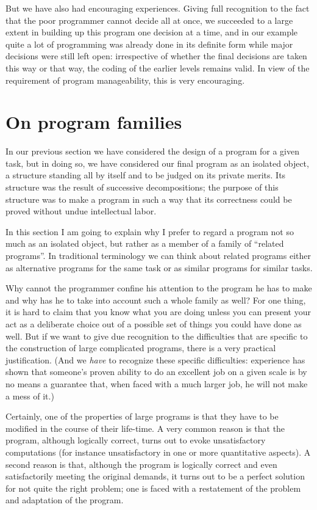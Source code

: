 But we have also had encouraging experiences. Giving full recognition to the fact that the poor programmer cannot decide all at once, we succeeded to a large extent in building up this program one decision at a time, and in our example quite a lot of programming was already done in its definite form while major decisions were still left open: irrespective of whether the final decisions are taken this way or that way, the coding of the earlier levels remains valid. In view of the requirement of program manageability, this is very encouraging.

\section{On program families}

In our previous section we have considered the design of a program for a given task, but in doing so, we have considered our final program as an isolated object, a structure standing all by itself and to be judged on its private merits. Its structure was the result of successive decompositions; the purpose of this structure was to make a program in such a way that its correctness could be proved without undue intellectual labor.

In this section I am going to explain why I prefer to regard a program not so much as an isolated object, but rather as a member of a family of ``related programs''. In traditional terminology we can think about related programs either as alternative programs for the same task or as similar programs for similar tasks.

Why cannot the programmer confine his attention to the program he has to make and why has he to take into account such a whole family as well? For one thing, it is hard to claim that you know what you are doing unless you can present your act as a deliberate choice out of a possible set of things you could have done as well. But if we want to give due recognition to the difficulties that are specific to the construction of large complicated programs, there is a very practical justification. (And we \textit{have} to recognize these specific difficulties: experience has shown that someone's proven ability to do an excellent job on a given scale is by no means a guarantee that, when faced with a much larger job, he will not make a mess of it.)

Certainly, one of the properties of large programs is that they have to be modified in the course of their life-time. A very common reason is that the program, although logically correct, turns out to evoke unsatisfactory computations (for instance unsatisfactory in one or more quantitative aspects). A second reason is that, although the program is logically correct and even satisfactorily meeting the original demands, it turns out to be a perfect solution for not quite the right problem; one is faced with a restatement of the problem and adaptation of the program.


